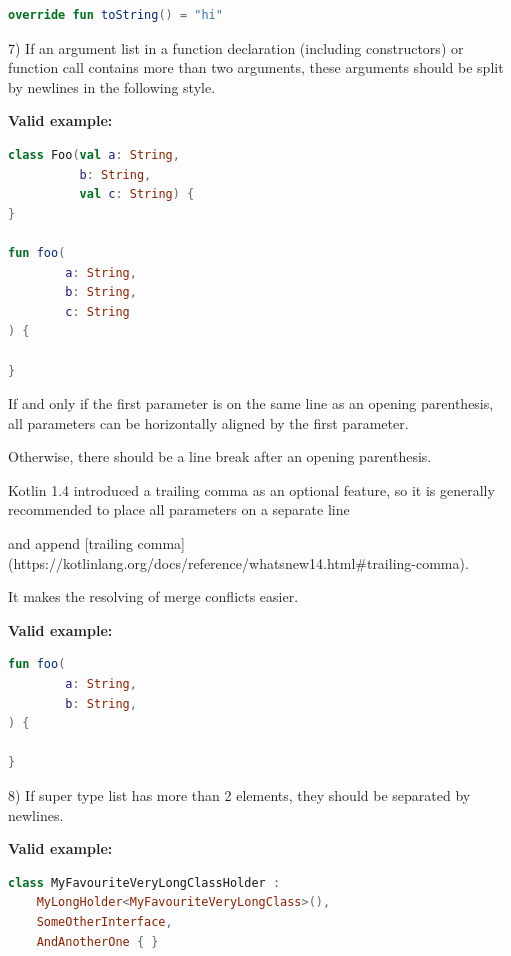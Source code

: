 {{\begin{lstlisting}[language=Kotlin]
override fun toString() = "hi"
\end{lstlisting}


7)  If an argument list in a function declaration (including constructors) or function call contains more than two arguments, these arguments should be split by newlines in the following style.



\textbf{Valid example:}

\begin{lstlisting}[language=Kotlin]
class Foo(val a: String,
          b: String,
          val c: String) {
}

fun foo(
        a: String,
        b: String,
        c: String
) {

}
\end{lstlisting}


If and only if the first parameter is on the same line as an opening parenthesis, all parameters can be horizontally aligned by the first parameter.

Otherwise, there should be a line break after an opening parenthesis.



Kotlin 1.4 introduced a trailing comma as an optional feature, so it is generally recommended to place all parameters on a separate line

and append [trailing comma](https://kotlinlang.org/docs/reference/whatsnew14.html\#trailing-comma).

It makes the resolving of merge conflicts easier.



\textbf{Valid example:}

\begin{lstlisting}[language=Kotlin]
fun foo(
        a: String,
        b: String,
) {

}
\end{lstlisting}


8) If super type list has more than 2 elements, they should be separated by newlines.



\textbf{Valid example:}

\begin{lstlisting}[language=Kotlin]
class MyFavouriteVeryLongClassHolder :
    MyLongHolder<MyFavouriteVeryLongClass>(),
    SomeOtherInterface,
    AndAnotherOne { }
\end{lstlisting}


}}
